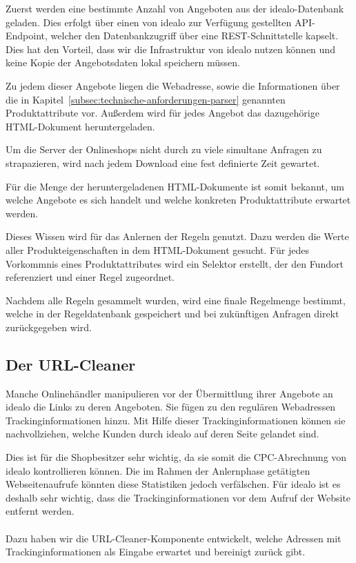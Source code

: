 Zuerst werden eine bestimmte Anzahl von Angeboten aus der idealo-Datenbank geladen.
Dies erfolgt über einen von idealo zur Verfügung gestellten API-Endpoint, welcher den Datenbankzugriff über eine
REST-Schnittstelle kapselt.
Dies hat den Vorteil, dass wir die Infrastruktur von idealo nutzen können und keine Kopie der Angebotsdaten
lokal speichern müssen.

Zu jedem dieser Angebote liegen die Webadresse, sowie die Informationen über die in
Kapitel~\ref{subsec:technische-anforderungen-parser} genannten Produktattribute vor.
Außerdem wird für jedes Angebot das dazugehörige HTML-Dokument heruntergeladen.

Um die Server der Onlineshops nicht durch zu viele simultane Anfragen zu strapazieren, wird nach jedem
Download eine fest definierte Zeit gewartet.

Für die Menge der heruntergeladenen HTML-Dokumente ist somit bekannt, um welche Angebote es sich handelt und welche
konkreten Produktattribute erwartet werden.

Dieses Wissen wird für das Anlernen der Regeln genutzt.
Dazu werden die Werte aller Produkteigenschaften in dem HTML-Dokument gesucht.
Für jedes Vorkommnis eines Produktattributes wird ein Selektor erstellt, der den Fundort referenziert und einer Regel
zugeordnet.

Nachdem alle Regeln gesammelt wurden, wird eine finale Regelmenge bestimmt, welche in der Regeldatenbank gespeichert
und bei zukünftigen Anfragen direkt zurückgegeben wird.

\subsection{Der URL-Cleaner}
\label{subsec:urlcleaner}

Manche Onlinehändler manipulieren vor der Übermittlung ihrer Angebote an idealo die Links zu deren Angeboten.
Sie fügen zu den regulären Webadressen Trackinginformationen hinzu.
Mit Hilfe dieser Trackinginformationen können sie nachvollziehen, welche Kunden durch idealo auf deren Seite gelandet
sind.

Dies ist für die Shopbesitzer sehr wichtig, da sie somit die CPC-Abrechnung von idealo kontrollieren können.
Die im Rahmen der Anlernphase getätigten Webseitenaufrufe könnten diese Statistiken jedoch verfälschen.
Für idealo ist es deshalb sehr wichtig, dass die Trackinginformationen vor dem Aufruf der Website entfernt werden.
\\
\\
Dazu haben wir die URL-Cleaner-Komponente entwickelt, welche Adressen mit Trackinginformationen als Eingabe erwartet und
bereinigt zurück gibt.

